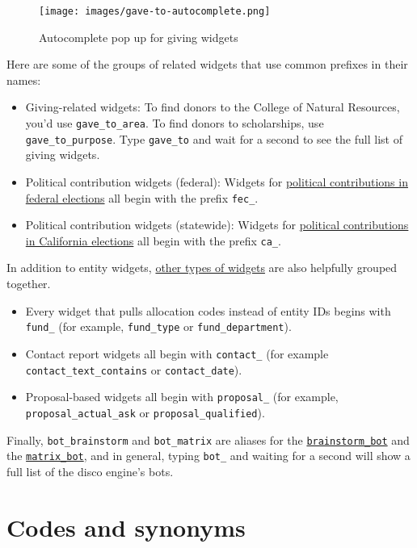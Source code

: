 \documentclass[]{book}
\providecommand{\tightlist}{%
  \setlength{\itemsep}{0pt}\setlength{\parskip}{0pt}}
\begin{document}
\begin{figure}
\centering
\texttt{[image: images/gave-to-autocomplete.png]}
\caption{Autocomplete pop up for giving widgets}
\end{figure}

Here are some of the groups of related widgets that use common prefixes in their names:

\begin{itemize}
\tightlist
\item
  Giving-related widgets: To find donors to the College of Natural Resources, you'd use \texttt{gave\_to\_area}. To find donors to scholarships, use \texttt{gave\_to\_purpose}. Type \texttt{gave\_to} and wait for a second to see the full list of giving widgets.
\item
  Political contribution widgets (federal): Widgets for \protect\hyperlink{ex-fec}{political contributions in federal elections} all begin with the prefix \texttt{fec\_}.
\item
  Political contribution widgets (statewide): Widgets for \protect\hyperlink{ex-ca-campaign}{political contributions in California elections} all begin with the prefix \texttt{ca\_}.
\end{itemize}

In addition to entity widgets, \protect\hyperlink{non-entity-widgets}{other types of widgets} are also helpfully grouped together.

\begin{itemize}
\tightlist
\item
  Every widget that pulls allocation codes instead of entity IDs begins with \texttt{fund\_} (for example, \texttt{fund\_type} or \texttt{fund\_department}).
\item
  Contact report widgets all begin with \texttt{contact\_} (for example \texttt{contact\_text\_contains} or \texttt{contact\_date}).
\item
  Proposal-based widgets all begin with \texttt{proposal\_} (for example, \texttt{proposal\_actual\_ask} or \texttt{proposal\_qualified}).
\end{itemize}

Finally, \texttt{bot\_brainstorm} and \texttt{bot\_matrix} are aliases for the \protect\hyperlink{brainstorm-bot}{\texttt{brainstorm\_bot}} and the \protect\hyperlink{matrix-bot}{\texttt{matrix\_bot}}, and in general, typing \texttt{bot\_} and waiting for a second will show a full list of the disco engine's bots.

\hypertarget{working-with-codes-synonyms}{%
\section{Codes and synonyms}\label{working-with-codes-synonyms}}
\end{document}
